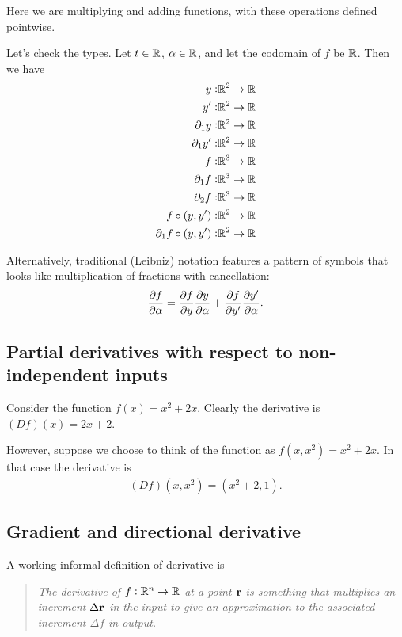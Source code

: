 Here we are multiplying and adding functions, with these operations defined pointwise.

Let's check the types. Let $t \in \mathbb{R}$, $\alpha \in \mathbb{R}$, and let the codomain of $f$ be $\mathbb{R}$. Then
we have
\begin{align*}
  y:                      &\mathbb{R}^2 \to \mathbb{R} \\
  y':                     &\mathbb{R}^2 \to \mathbb{R} \\
  \partial_1 y:               &\mathbb{R}^2 \to \mathbb{R} \\
  \partial_1 y':              &\mathbb{R}^2 \to \mathbb{R} \\
  f:                      &\mathbb{R}^3 \to \mathbb{R} \\
  \partial_1 f:               &\mathbb{R}^3 \to \mathbb{R} \\
  \partial_2 f:               &\mathbb{R}^3 \to \mathbb{R} \\
  f \circ (y, y'):        &\mathbb{R}^2 \to \mathbb{R} \\
  \partial_1 f \circ (y, y'): &\mathbb{R}^2 \to \mathbb{R}
\end{align*}

Alternatively, traditional (Leibniz) notation features a pattern of symbols that looks like
multiplication of fractions with cancellation:
\begin{align*}
  \pdv{f}{\alpha} = \pdv{f}{y} \pdv{y}{\alpha} + \pdv{f}{y'}\pdv{y'}{\alpha}.
\end{align*}



\subsection{Partial derivatives with respect to non-independent inputs}

Consider the function $f(x) = x^2 + 2x$. Clearly the derivative is $(D f)(x) = 2x + 2$.

However, suppose we choose to think of the function as $f(x, x^2) = x^2 + 2x$. In that case the
derivative is
\begin{align*}
  (D f)(x, x^2) = (x^2 + 2, 1).
\end{align*}



\subsection{Gradient and directional derivative}
\newpage
A working informal definition of derivative is
\begin{quote}
  \emph{
    The derivative of $f:\mathbb{R}^n \to \mathbb{R}$ at a point $\mathbf{r}$ is something that multiplies an increment
    $\Delta \mathbf{r}$ in the input to give an approximation to the associated increment $\Delta f$ in output.
  }
\end{quote}

